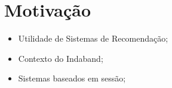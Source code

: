\section{Motivação}
\begin{itemize}
    \item Utilidade de Sistemas de Recomendação;
    \item Contexto do Indaband;
    \item Sistemas baseados em sessão;
\end{itemize}
\vspace{0.4cm}